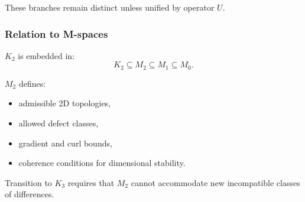These branches remain distinct unless unified by operator $U$.

\subsubsection{Relation to M-spaces}

$K_2$ is embedded in:
\[
K_2 \subseteq M_2 \subseteq M_1 \subseteq M_0.
\]

$M_2$ defines:
\begin{itemize}
    \item admissible 2D topologies,
    \item allowed defect classes,
    \item gradient and curl bounds,
    \item coherence conditions for dimensional stability.
\end{itemize}

Transition to $K_3$ requires that $M_2$ cannot accommodate new
incompatible classes of differences.
